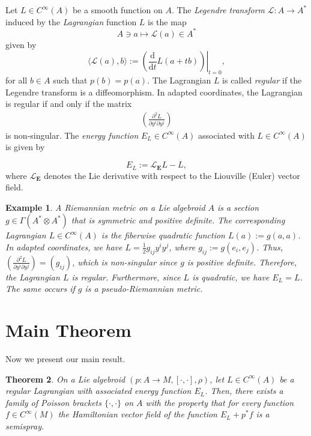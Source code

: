 \documentclass[12pt,letterpaper]{article}
\newtheorem{theorem}{Theorem}[section]
\newtheorem{example}[theorem]{Example}
\numberwithin{equation}{section}
\begin{document}
Let $L \in C^\infty(A) $ be a smooth function on $A$. The \emph{Legendre transform} $\mathscr{L} :  A \rightarrow A^*$ induced by the \emph{Lagrangian} function $L$ is the map 
$$ A \ni a \mapsto   \mathscr{L}(a) \in  A^*  $$
given by 
$$\langle  \mathscr{L}(a), b \rangle := \left.  \left( \frac{\mathrm{d}}{\mathrm{d}t}L(a+tb) \right)\right|_{t=0}, $$
for all $b\in A$ such that $p(b)=p(a).$ The Lagrangian $L$ is called \emph{regular} if the Legendre transform is a diffeomorphism. In  adapted coordinates, the Lagrangian is regular if and only if the matrix 
\begin{eqnarray*}
\left(  \frac{\partial^2 L}{\partial y^i\partial y^j} \right)
\end{eqnarray*}
is non-singular.
The \emph{energy function}  $E_L \in C^\infty(A) $ associated with $L \in C^\infty(A) $ is given by

\begin{equation}
E_L := \mathcal{L}_{\mathbf{E}}L -L, \label{ener-func}
\end{equation}
where $ \mathcal{L}_{\mathbf{E}}$ denotes the Lie derivative with respect to the Liouville (Euler) vector field.

\begin{example}\label{ex:RiemannLagrangian}
  A Riemannian metric on a Lie algebroid $A$ is a section $g\in \Gamma(A^*\otimes A^*)$ that is symmetric and positive definite. 
  The corresponding Lagrangian $L \in C^\infty(A) $ is the fiberwise quadratic function $L(a):= g(a,a)$.
  In adapted coordinates, we have $L=\tfrac{1}{2}g_{ij}y^iy^j$, where $g_{ij}:=g(e_i,e_j)$.
  Thus, $\left( \frac{\partial^2 L}{\partial y^i\partial y^j} \right)=(g_{ij})$, which is non-singular since $g$ is positive definite.
  Therefore, the Lagrangian $L$ is regular.
  Furthermore, since $L$ is quadratic, we have $E_L=L$.
  The same occurs if $g$ is a pseudo-Riemannian metric.
\end{example}

\section{Main Theorem}\label{sec:main}


Now we present our main result.


\begin{theorem}\label{maintheorem}
On a Lie algebroid $(p: A \rightarrow M, [ \cdot, \cdot ], \rho)$, let  $L\in C^\infty(A)$ be a regular Lagrangian  
with associated energy function $E_L$.
Then, there exists a family of Poisson brackets $ \{ \cdot , \cdot \} $ on $A$ with the property that 
for every function $f\in C^\infty(M)$ the Hamiltonian vector field of the function $E_L +p^*f $ is a semispray.
\end{theorem}
\end{document}
